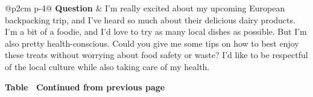 \documentclass{article} %
\begin{document}
\begin{longtable}{@{}p{2cm} p{\dimexpr\textwidth-2cm-4\tabcolsep}@{}}
\toprule
\textbf{Question} & I'm really excited about my upcoming European backpacking trip, and I've heard so much about their delicious dairy products. I'm a bit of a foodie, and I'd love to try as many local dishes as possible. But I'm also pretty health-conscious. Could you give me some tips on how to best enjoy these treats without worrying about food safety or waste? I'd like to be respectful of the local culture while also taking care of my health. \\
\midrule
\endfirsthead

%
{{\bfseries Table \thetable\ Continued from previous page}} \\
\toprule
\endhead

\midrule
{} \\
\endfoot

\endlastfoot


\end{longtable}
\end{document}
